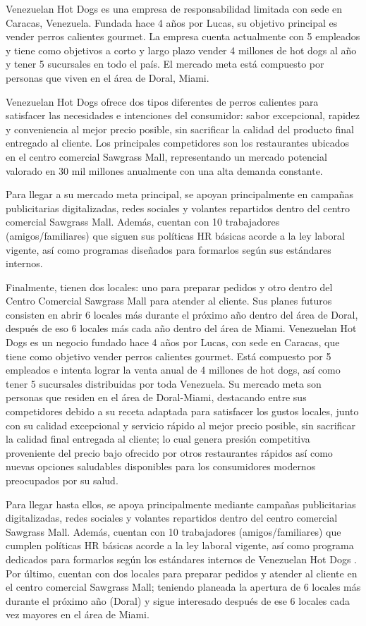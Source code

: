 Venezuelan Hot Dogs es una empresa de responsabilidad limitada con sede en Caracas, Venezuela. Fundada hace 4 años por Lucas, su objetivo principal es vender perros calientes gourmet. La empresa cuenta actualmente con 5 empleados y tiene como objetivos a corto y largo plazo vender 4 millones de hot dogs al año y tener 5 sucursales en todo el país. El mercado meta está compuesto por personas que viven en el área de Doral, Miami. 

Venezuelan Hot Dogs ofrece dos tipos diferentes de perros calientes para satisfacer las necesidades e intenciones del consumidor: sabor excepcional, rapidez y conveniencia al mejor precio posible, sin sacrificar la calidad del producto final entregado al cliente. Los principales competidores son los restaurantes ubicados en el centro comercial Sawgrass Mall, representando un mercado potencial valorado en 30 mil millones anualmente con una alta demanda constante.

Para llegar a su mercado meta principal, se apoyan principalmente en campañas publicitarias digitalizadas, redes sociales y volantes repartidos dentro del centro comercial Sawgrass Mall. Además, cuentan con 10 trabajadores (amigos/familiares) que siguen sus políticas HR básicas acorde a la ley laboral vigente, así como programas diseñados para formarlos según sus estándares internos. 

Finalmente, tienen dos locales: uno para preparar pedidos y otro dentro del Centro Comercial Sawgrass Mall para atender al cliente. Sus planes futuros consisten en abrir 6 locales más durante el próximo año dentro del área de Doral, después de eso 6 locales más cada año dentro del área de Miami.
Venezuelan Hot Dogs es un negocio fundado hace 4 años por Lucas, con sede en Caracas, que tiene como objetivo vender perros calientes gourmet. Está compuesto por 5 empleados e intenta lograr la venta anual de 4 millones de hot dogs, así como tener 5 sucursales distribuidas por toda Venezuela. Su mercado meta son personas que residen en el área de Doral-Miami, destacando entre sus competidores debido a su receta adaptada para satisfacer los gustos locales, junto con su calidad excepcional y servicio rápido al mejor precio posible, sin sacrificar la calidad final entregada al cliente; lo cual genera presión competitiva proveniente del precio bajo ofrecido por otros restaurantes rápidos así como nuevas opciones saludables disponibles para los consumidores modernos preocupados por su salud. 

Para llegar hasta ellos, se apoya principalmente mediante campañas publicitarias digitalizadas, redes sociales y volantes repartidos dentro del centro comercial Sawgrass Mall. Además, cuentan con 10 trabajadores (amigos/familiares) que cumplen políticas HR básicas acorde a la ley laboral vigente, así como programa dedicados para formarlos según los estándares internos de Venezuelan Hot Dogs . Por último, cuentan con dos locales para preparar pedidos y atender al cliente en el centro comercial Sawgrass Mall; teniendo planeada la apertura de 6 locales más durante el próximo año (Doral) y sigue interesado después de ese 6 locales cada vez mayores en el área de Miami.
